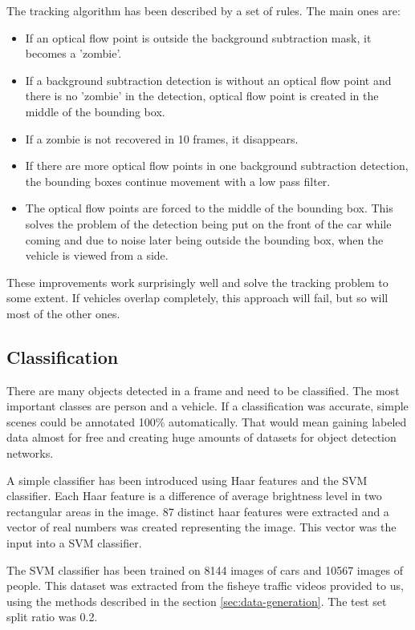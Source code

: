 \documentclass[a4paper,12pt,titlepage, twoside]{article}
\numberwithin{figure}{section}
\begin{document}
The tracking algorithm has been described by a set of rules. The main ones are:
\begin{itemize}
	\item If an optical flow point is outside the background subtraction mask, it becomes a 'zombie'.
	\item If a background subtraction detection is without an optical flow point and there is no 'zombie' in the detection, optical flow point is created in the middle of the bounding box. 
	\item If a zombie is not recovered in 10 frames, it disappears. 
	\item If there are more optical flow points in one background subtraction detection, the bounding boxes continue movement with a low pass filter.
	\item The optical flow points are forced to the middle of the bounding box. This solves the problem of the detection being put on the front of the car while coming and due to noise later being outside the bounding box, when the vehicle is viewed from a side. 
\end{itemize}

These improvements work surprisingly well and solve the tracking problem to some extent. If vehicles overlap completely, this approach will fail, but so will most of the other ones. 

\subsection{Classification}
There are many objects detected in a frame and need to be classified. The most important classes are person and a vehicle. If a classification was accurate, simple scenes could be annotated 100\% automatically. That would mean gaining labeled data almost for free and creating huge amounts of datasets for object detection networks.

A simple classifier has been introduced using Haar features \cite{haar} and the SVM classifier. Each Haar feature is a difference of average brightness level in two rectangular areas in the image. 87 distinct haar features were extracted and a vector of real numbers was created representing the image. This vector was the input into a SVM classifier.

The SVM classifier has been trained on 8144 images of cars and 10567 images of people. This dataset was extracted from the fisheye traffic videos provided to us, using the methods described in the section \ref{sec:data-generation}. The test set split ratio was 0.2.
\end{document}
